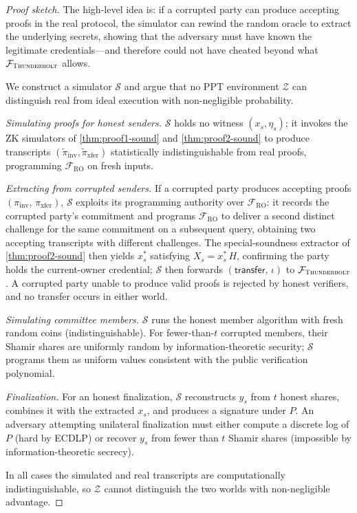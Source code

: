 \begin{proof}[Proof sketch]
The high-level idea is: if a corrupted party can produce accepting proofs in the real protocol, the simulator can rewind the random oracle to extract the underlying secrets, showing that the adversary must have known the legitimate credentials---and therefore could not have cheated beyond what $\mathcal{F}_{\textsc{Thunderbolt}}$ allows.

We construct a simulator $\mathcal{S}$ and argue that no PPT environment $\mathcal{Z}$ can distinguish
real from ideal execution with non-negligible probability.

\emph{Simulating proofs for honest senders.}
$\mathcal{S}$ holds no witness $(x_s, \eta_s)$; it invokes the ZK simulators of \autoref{thm:proof1-sound} and \autoref{thm:proof2-sound} to produce transcripts $(\tilde\pi_{\mathrm{inv}}, \tilde\pi_{\mathrm{xfer}})$ statistically indistinguishable from real proofs, programming $\mathcal{F}_{\mathrm{RO}}$ on fresh inputs.

\emph{Extracting from corrupted senders.}
If a corrupted party produces accepting proofs $(\pi_{\mathrm{inv}},\, \pi_{\mathrm{xfer}})$,
$\mathcal{S}$ exploits its programming authority over $\mathcal{F}_{\mathrm{RO}}$: it records the corrupted party's commitment and programs $\mathcal{F}_{\mathrm{RO}}$ to deliver a second distinct challenge for the same commitment on a subsequent query, obtaining two accepting transcripts with different challenges.
The special-soundness extractor of \autoref{thm:proof2-sound} then yields $x_s^*$ satisfying
$X_s = x_s^*\,H$, confirming the party holds the current-owner credential;
$\mathcal{S}$ then forwards $(\mathsf{transfer},\, \iota)$ to $\mathcal{F}_{\textsc{Thunderbolt}}$.
A corrupted party unable to produce valid proofs is rejected by honest verifiers,
and no transfer occurs in either world.

\emph{Simulating committee members.}
$\mathcal{S}$ runs the honest member algorithm with fresh random coins (indistinguishable). For fewer-than-$t$ corrupted members, their Shamir shares are uniformly random by information-theoretic security; $\mathcal{S}$ programs them as uniform values consistent with the public verification polynomial.

\emph{Finalization.}
For an honest finalization, $\mathcal{S}$ reconstructs $y_s$ from $t$ honest shares, combines it
with the extracted $x_s$, and produces a signature under $P$.
An adversary attempting unilateral finalization must either compute a discrete log of $P$ (hard by
ECDLP) or recover $y_s$ from fewer than $t$ Shamir shares (impossible by information-theoretic
secrecy).

In all cases the simulated and real transcripts are computationally indistinguishable,
so $\mathcal{Z}$ cannot distinguish the two worlds with non-negligible advantage.
\end{proof}

